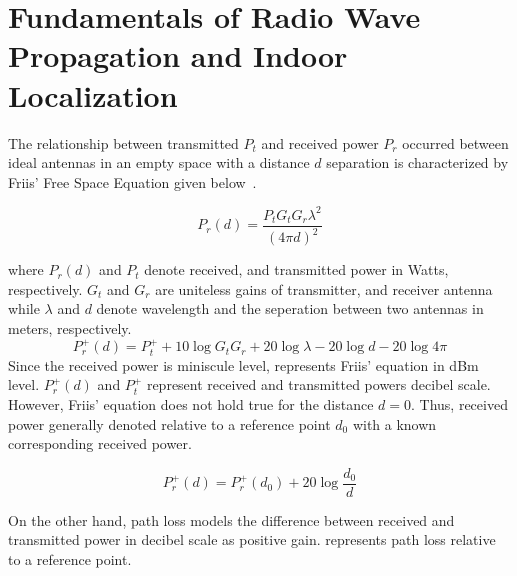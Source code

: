 \section{\label{sec-FU}Fundamentals of Radio Wave Propagation and Indoor Localization}
    The relationship between transmitted $P_t$ and received power $P_r$ occurred between ideal antennas in an empty space with a distance $d$ separation is characterized by Friis' Free Space Equation given below~\cite{friis1946note}.

    \begin{equation}
        \label{eq:friisWatts}
            P_r(d) = \dfrac{P_t  G_t  G_r \lambda^2}{{\left(4 \pi d\right)}^2}
    \end{equation}

    \noindent where $P_r(d)$ and $P_t$ denote received, and transmitted power in Watts, respectively.
    $G_t$ and $G_r$ are uniteless gains of transmitter, and receiver antenna while $\lambda$ and $d$ denote wavelength and the seperation between two antennas in meters, respectively.
    \begin{equation}
        \label{eq:friisdBm}
        P^{+}_r(d) = P^{+}_t + 10 \log{G_t G_r} + 20 \log{\lambda} - 20 \log{d} - 20 \log{4 \pi}
    \end{equation}
    Since the received power is miniscule level,  represents Friis' equation in dBm level.
    $P^{+}_r(d)$ and $P^{+}_t$ represent received and transmitted powers decibel scale.
    However, Friis' equation does not hold true for the distance $d = 0$.
    Thus, received power generally denoted relative to a reference point $d_0$ with a known corresponding received power.

    \begin{equation}
        \label{eq:friisRef}
        P^{+}_r(d) = P^{+}_r(d_0) + 20 \log{\dfrac{d_0}{d}}
    \end{equation}

    On the other hand, path loss models the difference between received and transmitted power in decibel scale as positive gain.
     represents path loss relative to a reference point.

